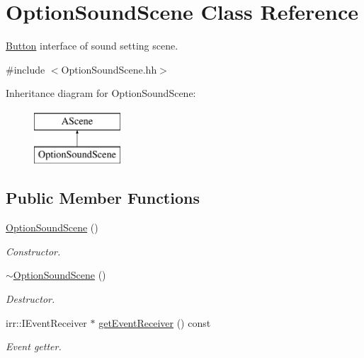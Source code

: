\hypertarget{classOptionSoundScene}{}\section{Option\+Sound\+Scene Class Reference}
\label{classOptionSoundScene}


\hyperlink{classButton}{Button} interface of sound setting scene.  




{\ttfamily \#include $<$Option\+Sound\+Scene.\+hh$>$}

Inheritance diagram for Option\+Sound\+Scene\+:\begin{figure}[H]
\begin{center}
\leavevmode
\includegraphics[height=2.000000cm]{classOptionSoundScene}
\end{center}
\end{figure}
\subsection*{Public Member Functions}
\begin{DoxyCompactItemize}
\item 
\hyperlink{classOptionSoundScene_abb8409b9b9225118e2779a1e0e7a4b45}{Option\+Sound\+Scene} ()
\begin{DoxyCompactList}\small\item\em Constructor. \end{DoxyCompactList}\item 
\hyperlink{classOptionSoundScene_afaf96649164e48bb5820cca80bc5c024}{$\sim$\+Option\+Sound\+Scene} ()
\begin{DoxyCompactList}\small\item\em Destructor. \end{DoxyCompactList}\item 
irr\+::\+I\+Event\+Receiver $\ast$ \hyperlink{classOptionSoundScene_ac71da65763f0db4b05fc32444308b677}{get\+Event\+Receiver} () const
\begin{DoxyCompactList}\small\item\em Event getter. \end{DoxyCompactList}\end{DoxyCompactItemize}


